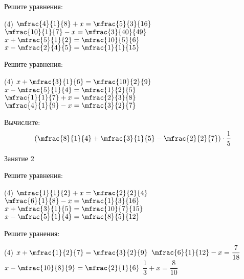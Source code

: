 %
%

\begin{class}[number=1]
	\begin{listofex}
		\item Решите уравнения:
		\begin{tasks}(4)
			\task \( \mfrac{4}{1}{8}+x=\mfrac{5}{3}{16} \)
			\task \( \mfrac{10}{1}{7}-x=\mfrac{3}{40}{49} \)
			\task \( x+\mfrac{5}{1}{2}=\mfrac{10}{5}{6} \)
			\task \( x-\mfrac{2}{4}{5}=\mfrac{1}{1}{15} \)
		\end{tasks}
		\item Решите уравнения:
		\begin{tasks}(4)
			\task \( x+\mfrac{3}{1}{6}=\mfrac{10}{2}{9} \)
			\task \( x-\mfrac{5}{1}{4}=\mfrac{1}{2}{5} \)
			\task \( \mfrac{1}{1}{7}+x=\mfrac{2}{3}{8} \)
			\task \( \mfrac{4}{1}{9}-x=\mfrac{3}{2}{7} \)
		\end{tasks}
		\item Вычислите: 
		\[ \left( \mfrac{8}{1}{4}+\mfrac{3}{1}{5}-\mfrac{2}{2}{7}  \right)\cdot\dfrac{1}{5}\]
	\end{listofex}
\end{class}

\begin{class}[number=2]
	\begin{listofex}
		\item Занятие 2
	\end{listofex}
\end{class}

\begin{homework}[number=1]
	\begin{listofex}
		\item Решите уравнения:
		\begin{tasks}(4)
			\task \( \mfrac{1}{1}{2}+x=\mfrac{2}{2}{4} \)
			\task \( \mfrac{6}{1}{8}-x=\mfrac{1}{3}{16} \)
			\task \( x+\mfrac{3}{1}{5}=\mfrac{10}{7}{15} \)
			\task \( x-\mfrac{5}{1}{4}=\mfrac{8}{5}{12} \)
		\end{tasks}
		\item Решите уранения:
		\begin{tasks}(4)
			\task \( x+\mfrac{1}{2}{7}=\mfrac{3}{2}{9} \)
			\task \( \mfrac{6}{1}{12}-x=\dfrac{7}{18} \)
			\task \( x-\mfrac{10}{8}{9}=\mfrac{2}{1}{6} \)
			\task \( \dfrac{1}{3}+x=\dfrac{8}{10} \)
		\end{tasks}
	\end{listofex}
\end{homework}


